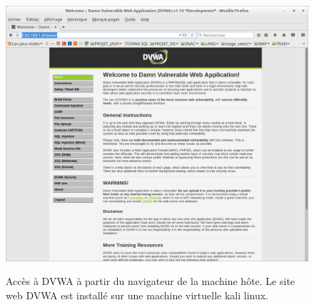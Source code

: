  \begin{figure}[!h]
 	\begin{center}
 		\label{}
 		\includegraphics[scale=\scaledvwa]{images/dvwa.png}
 		\caption{Accès à DVWA à partir du navigateur de la machine hôte. Le site web DVWA est installé sur une machine virtuelle kali linux.}
 	\end{center}
 \end{figure}


